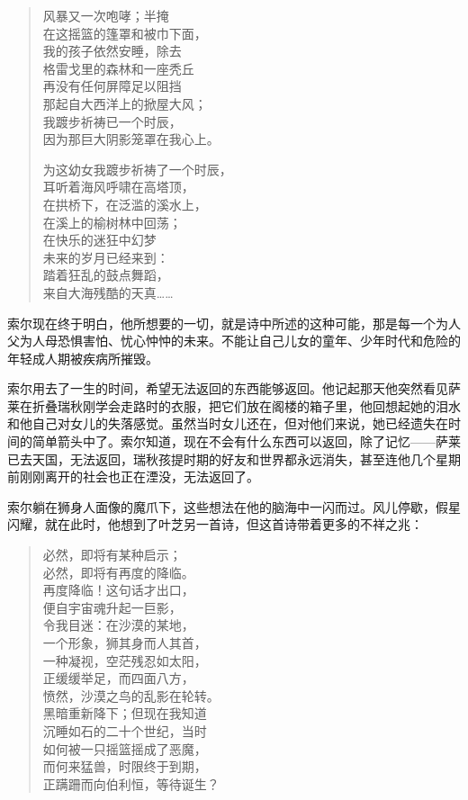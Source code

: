 \documentclass[AutoFakeBold=true]{book}
\begin{document}
\begin{quote}
	风暴又一次咆哮；半掩\\
	在这摇篮的篷罩和被巾下面，\\
	我的孩子依然安睡，除去\\
	格雷戈里的森林和一座秃丘\\
	再没有任何屏障足以阻挡\\
	那起自大西洋上的掀屋大风；\\
	我踱步祈祷已一个时辰，\\
	因为那巨大阴影笼罩在我心上。

\vspace*{1em}

	为这幼女我踱步祈祷了一个时辰，\\
	耳听着海风呼啸在高塔顶，\\
	在拱桥下，在泛滥的溪水上，\\
	在溪上的榆树林中回荡；\\
	在快乐的迷狂中幻梦\\
	未来的岁月已经来到：\\
	踏着狂乱的鼓点舞蹈，\\
	来自大海残酷的天真……
\end{quote}

索尔现在终于明白，他所想要的一切，就是诗中所述的这种可能，那是每一个为人父为人母恐惧害怕、忧心忡忡的未来。不能让自己儿女的童年、少年时代和危险的年轻成人期被疾病所摧毁。

索尔用去了一生的时间，希望无法返回的东西能够返回。他记起那天他突然看见萨莱在折叠瑞秋刚学会走路时的衣服，把它们放在阁楼的箱子里，他回想起她的泪水和他自己对女儿的失落感觉。虽然当时女儿还在，但对他们来说，她已经遗失在时间的简单箭头中了。索尔知道，现在不会有什么东西可以返回，除了记忆——萨莱已去天国，无法返回，瑞秋孩提时期的好友和世界都永远消失，甚至连他几个星期前刚刚离开的社会也正在湮没，无法返回了。

索尔躺在狮身人面像的魔爪下，这些想法在他的脑海中一闪而过。风儿停歇，假星闪耀，就在此时，他想到了叶芝另一首诗，但这首诗带着更多的不祥之兆：

\begin{quote}
	{\kaishu 必然，即将有某种启示；\\
	必然，即将有再度的降临。\\
	再度降临！这句话才出口，\\
	便自宇宙魂升起一巨影，\\
	令我目迷：在沙漠的某地，\\
	一个形象，狮其身而人其首，\\
	一种凝视，空茫残忍如太阳，\\
	正缓缓举足，而四面八方，\\
	愤然，沙漠之鸟的乱影在轮转。\\
	黑暗重新降下；但现在我知道\\
	沉睡如石的二十个世纪，当时\\
	如何被一只摇篮摇成了恶魔，\\
	而何来猛兽，时限终于到期，\\
	正蹒跚而向伯利恒，等待诞生？}
\end{quote}
\end{document}
